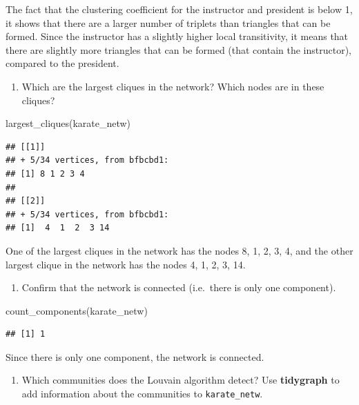 \documentclass[
]{article}
\newenvironment{Shaded}{\begin{snugshade}}{\end{snugshade}}
\newcommand{\FunctionTok}[1]{\textcolor[rgb]{0.00,0.00,0.00}{#1}}
\newcommand{\NormalTok}[1]{#1}
\providecommand{\tightlist}{%
  \setlength{\itemsep}{0pt}\setlength{\parskip}{0pt}}
\begin{document}
\Ans

The fact that the clustering coefficient for the instructor and
president is below 1, it shows that there are a larger number of
triplets than triangles that can be formed. Since the instructor has a
slightly higher local transitivity, it means that there are slightly
more triangles that can be formed (that contain the instructor),
compared to the president.

\begin{enumerate}
\def\labelenumi{(\arabic{enumi})}
\setcounter{enumi}{7}
\tightlist
\item
  Which are the largest cliques in the network? Which nodes are in these
  cliques?
\end{enumerate}

\begin{Shaded}
\begin{Highlighting}[]
\FunctionTok{largest\_cliques}\NormalTok{(karate\_netw)}
\end{Highlighting}
\end{Shaded}

\begin{verbatim}
## [[1]]
## + 5/34 vertices, from bfbcbd1:
## [1] 8 1 2 3 4
## 
## [[2]]
## + 5/34 vertices, from bfbcbd1:
## [1]  4  1  2  3 14
\end{verbatim}

\Ans One of the largest cliques in the network has the nodes 8, 1, 2, 3,
4, and the other largest clique in the network has the nodes 4, 1, 2, 3,
14.

\begin{enumerate}
\def\labelenumi{(\arabic{enumi})}
\setcounter{enumi}{8}
\tightlist
\item
  Confirm that the network is connected (i.e.~there is only one
  component).
\end{enumerate}

\begin{Shaded}
\begin{Highlighting}[]
\FunctionTok{count\_components}\NormalTok{(karate\_netw)}
\end{Highlighting}
\end{Shaded}

\begin{verbatim}
## [1] 1
\end{verbatim}

\Ans Since there is only one component, the network is connected.

\begin{enumerate}
\def\labelenumi{(\arabic{enumi})}
\setcounter{enumi}{9}
\tightlist
\item
  Which communities does the Louvain algorithm detect? Use
  \textbf{tidygraph} to add information about the communities to
  \texttt{karate\_netw}.
\end{enumerate}
\end{document}
